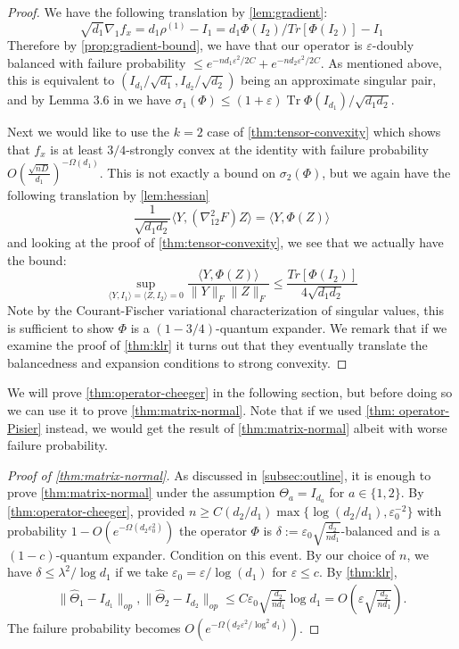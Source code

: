 \documentclass{article}
\newcommand\eps{\varepsilon}
\newcommand\tr{\operatorname{Tr}}
\begin{document}
\begin{proof}
We have the following translation by \cref{lem:gradient}:
\[ \sqrt{d_{1}} \nabla_{1} f_{x} = d_{1} \rho^{(1)} - I_{1} = d_{1} \Phi(I_{2})/ Tr[\Phi(I_{2})] - I_{1}  \]
Therefore by \cref{prop:gradient-bound}, we have that our operator is $\eps$-doubly balanced with failure probability $\leq e^{-n d_{1} \eps^2/2C} + e^{-n d_{2} \eps^2/2C}$. As mentioned above, this is equivalent to $(I_{d_1}/\sqrt{d_1}, I_{d_2}/\sqrt{d_2})$ being an approximate singular pair, and by Lemma 3.6 in \cite{KLR19} we have $\sigma_1(\Phi) \leq (1+\eps)  \tr \Phi(I_{d_1})/\sqrt{d_1 d_2}$. 

Next we would like to use the $k=2$ case of \cref{thm:tensor-convexity} which shows that $f_{x}$ is at least $3/4$-strongly convex at the identity with failure probability $O \left(\frac {\sqrt{nD}}{d_1}\right)^{ - \Omega(d_1)}$. This is not exactly a bound on $\sigma_{2}(\Phi)$, but we again have the following translation by \cref{lem:hessian}
\[ \frac{1}{\sqrt{d_{1} d_{2}}} \langle Y, (\nabla_{12}^{2} F) Z \rangle = \langle Y, \Phi(Z) \rangle        \]
and looking at the proof of \cref{thm:tensor-convexity}, we see that we actually have the bound:
\[ \sup_{\langle Y, I_{1} \rangle = \langle Z, I_{2} \rangle = 0} \frac{\langle Y, \Phi(Z) \rangle}{\|Y\|_{F} \|Z\|_{F}} \leq \frac{Tr[\Phi(I_{2})]}{4 \sqrt{d_{1} d_{2}}}       \]
Note by the Courant-Fischer variational characterization of singular values, this is sufficient to show $\Phi$ is a $(1-3/4)$-quantum expander. We remark that if we examine the proof of \cref{thm:klr} it turns out that they eventually translate the balancedness and expansion conditions to strong convexity. 
\end{proof}

We will prove \cref{thm:operator-cheeger} in the following section, but before doing so we can use it to prove \cref{thm:matrix-normal}. Note that if we used \cref{thm: operator-Pisier} instead, we would get the result of \cref{thm:matrix-normal} albeit with worse failure probability. 

\begin{proof}[Proof of \cref{thm:matrix-normal}] As discussed in \cref{subsec:outline}, it is enough to prove \cref{thm:matrix-normal} under the assumption $\Theta_a = I_{d_a}$ for $a \in \{1,2\}$. By \cref{thm:operator-cheeger}, provided $n \geq C (d_2/d_1) \max\{\log (d_2/d_1),  \eps_0^{-2}\} $ with probability $1 - O(e^{ - \Omega( d_2 \eps_0^2)})$ the operator $\Phi$ is $\delta:=\eps_0  \sqrt{\frac{d_2}{n d_1}}$-balanced and is a $(1 - c)$-quantum expander. Condition on this event. By our choice of $n$, we have $\delta \leq \lambda^2/\log d_1$ if we take $\eps_0 = \eps/\log(d_1)$ for $\eps \leq c$. By \cref{thm:klr},
\begin{gather*} \| \widehat{\Theta}_1 - I_{d_1}\|_{op}, \| \widehat{\Theta}_2 - I_{d_2}\|_{op} \leq C \eps_0 \sqrt{\frac{d_2}{n d_1}} \log d_1 = O\left(\eps \sqrt{\frac{d_2}{n d_1}}\right).\end{gather*}
The failure probability becomes $O(e^{ - \Omega( d_2 \eps^2/\log^2 d_1)})$.
\end{proof}
\end{document}
